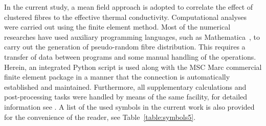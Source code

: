 	In the current study, a mean field approach is adopted to correlate the effect of clustered fibres to the effective thermal conductivity. Computational analyses were carried out using the finite element method. Most of the numerical researches have used auxiliary programming languages, such as Mathematica~\autocite{GomezMunoz.2008}, to carry out the generation of pseudo-random fibre distribution. This requires a transfer of data between programs and some manual handling of the operations. Herein, an integrated Python script is used along with the MSC Marc commercial finite element package in a manner that the connection is automatically established and maintained. Furthermore, all supplementary calculations and post-processing tasks were handled by means of the same facility, for detailed information see \autocite{Javanbakht.2017}. A list of the used symbols in the current work is also provided for the convenience of the reader, see Table~\ref{table:symbols5}.

